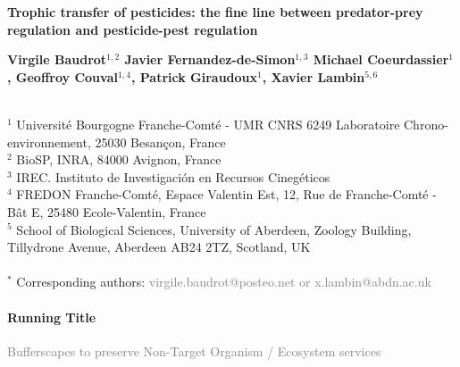 \documentclass[11pt]{article}
\begin{document}

\begin{center}
	\Large\textbf{
		Trophic transfer of pesticides: the fine line between predator-prey regulation and pesticide-pest regulation
	}\par
\end{center}

\vspace{.5cm}

\begin{center}
	\large\textbf{
		Virgile Baudrot$^{1,2}$ 
		Javier Fernandez-de-Simon$^{1,3}$
		Michael Coeurdassier$^1$,
		Geoffroy Couval$^{1,4}$,
		Patrick Giraudoux$^1$,
		Xavier Lambin$^{5,6}$		
	}\par	
\end{center}
~\\
$^1$ Université Bourgogne Franche-Comté - UMR CNRS 6249 Laboratoire Chrono-environnement, 25030 Besançon, France\\
$^2$ BioSP, INRA, 84000 Avignon, France\\
$^3$ IREC. Instituto de Investigación en Recursos Cinegéticos\\
$^4$ FREDON Franche-Comté, Espace Valentin Est, 12, Rue de Franche-Comté - Bât E, 25480 Ecole-Valentin, France\\
$^5$ School of Biological Sciences, University of Aberdeen, Zoology Building, Tillydrone Avenue, Aberdeen AB24 2TZ, Scotland, UK\\
~\\
$^*$ Corresponding authors: \textcolor{gray}{virgile.baudrot@posteo.net or x.lambin@abdn.ac.uk}

\paragraph{Running Title} \textcolor{gray}{Bufferscapes to preserve Non-Target Organism / Ecosystem services}

\vspace{.5cm}
\end{document}
